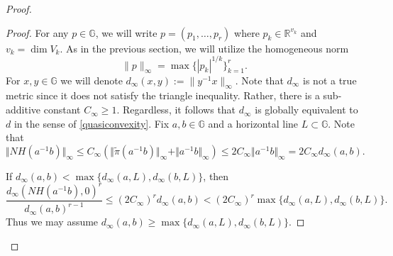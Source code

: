 \documentclass[11pt]{amsart}
\theoremstyle{definition}
\newcommand{\G}{\mathbb G}
\numberwithin{theorem}{section} \numberwithin{equation}{section}
\begin{document}
\begin{proof}
\begin{proof}
For any $p \in \mathbb{G}$, 
we will write $p = (p_1,\dots,p_r)$
where $p_k \in \mathbb{R}^{v_k}$ and $v_k = \dim V_k$.
As in the previous section, we will utilize the homogeneous norm
$$
\|p\|_{\infty} = \max\{ |p_k|^{1/k} \}_{k=1}^r.
$$
For $x,y \in \G$ we will denote $d_\infty(x,y):=  \|y^{-1}x \|_\infty$. 
Note that $d_{\infty}$ is not a true metric since it does not satisfy the triangle inequality.
Rather, there is a sub-additive constant $C_\infty \geq 1$.
Regardless, it follows that $d_\infty$ is globally equivalent to $d$ 
in the sense of \eqref{quasiconvexity}.
Fix $a,b \in \mathbb{G}$ and a horizontal line $L \subset \mathbb{G}$.
Note that
\begin{equation}
\label{NHcompactbound}
\Vert NH(a^{-1}b) \Vert_\infty
\leq C_{\infty} (\Vert \tilde{\pi}(a^{-1}b) \Vert_\infty + \Vert a^{-1}b \Vert_\infty)
\leq 2 C_{\infty} \Vert a^{-1} b \Vert_\infty = 2C_{\infty}d_\infty(a,b).
\end{equation}

If $d_\infty(a,b) < \max \{ d_\infty(a,L),d_\infty(b,L) \}$,
then 
$$
\frac{d_\infty(NH(a^{-1}b),0)^{r}}{d_\infty(a,b)^{r-1}} 
\leq (2C_{\infty})^r d_\infty(a,b)
< (2C_{\infty})^r  \max \{ d_\infty(a,L),d_\infty(b,L) \}.
$$
Thus we may assume $d_\infty(a,b) \geq \max \{ d_\infty(a,L),d_\infty(b,L) \}$.


\end{proof}
\end{proof}
\end{document}
